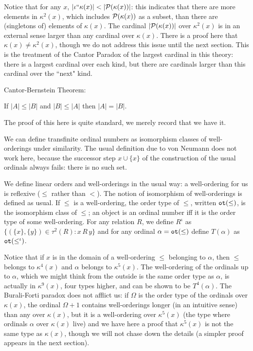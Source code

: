 \documentclass[12pt]{article}
\begin{document}
\medskip

Notice that for any $x$, $|\iota``\kappa(x)| < |{\cal P}(\kappa(x))|$:  this indicates that there are more elements in $\kappa^2(x)$, which includes ${\cal P}(\kappa(x))$ as a subset, than there are (singletons of) elements of $\kappa(x)$.  The cardinal $|{\cal P}(\kappa(x))|$ over $\kappa^2(x)$ is in an external sense larger than any cardinal over $\kappa(x)$.  There is a proof here that $\kappa(x) \neq \kappa^2(x)$, though we do not address this issue until the next section.  This is the treatment of the Cantor Paradox of the largest cardinal in this theory:  there is a largest cardinal
over each kind, but there are cardinals larger than this cardinal over the ``next" kind.

\begin{thm} Cantor-Bernstein Theorem:

  If $|A| \leq |B|$ and $|B| \leq |A|$ then $|A|=|B|$.\end{thm}

\Proof

The proof of this here is quite standard, we merely record that we have it.

\endproof

We can define transfinite ordinal numbers as isomorphism classes of well-orderings under similarity.  The usual definition due to von Neumann does not work here, because the successor step $x \cup \{x\}$ of the construction of the usual ordinals always fails:  there is no such set.

 We define linear orders and well-orderings in the usual way:  a well-ordering for us is reflexive ($\leq$ rather than $<$).  The notion of isomorphism of well-orderings is defined as usual.  If $\leq$ is a well-ordering, the order type of $\leq$, written ${\tt ot}(\leq)$, is the isomorphism class of $\leq$;  an object is an ordinal number iff it is the order type of some well-ordering.  For any relation $R$, we define $R^{\iota}$ as $\{(\{x\},\{y\}) \in \tau^2(R):x \, R \, y\}$ and for any ordinal $\alpha ={\tt ot}(\leq)$ define $T(\alpha)$ as ${\tt ot}(\leq^\iota)$.

Notice that if $x$ is in the domain of a well-ordering $\leq$ belonging to $\alpha$, then $\leq$ belongs to $\kappa^4(x)$ and $\alpha$ belongs to $\kappa^5(x)$.  The well-ordering of the ordinals up to $\alpha$, which we might think from the outside is the same order type as $\alpha$, is actually in $\kappa^9(x)$, four types higher, and can be shown to be $T^4(\alpha)$.  The Burali-Forti paradox does not afflict us: if $\Omega$ is the order type of the ordinals over $\kappa(x)$,  the ordinal $\Omega+1$ contains well-orderings longer (in an intuitive sense) than any over $\kappa(x)$, but it is a well-ordering over $\kappa^5(x)$ (the type where ordinals $\alpha$ over $\kappa(x)$ live) and we have here a proof
that $\kappa^5(x)$ is not the same type as $\kappa(x)$, though we will not chase down the details (a simpler proof appears in the next section).
\end{document}

